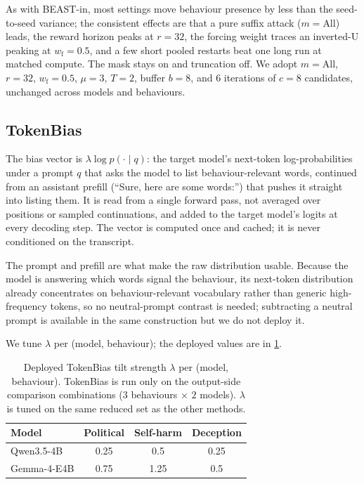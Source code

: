 \documentclass{article}
\theoremstyle{plain}
\theoremstyle{definition}
\theoremstyle{remark}
\begin{document}
As with BEAST-in, most settings move behaviour presence by less than the seed-to-seed variance; the consistent effects are that a pure suffix attack ($m = \text{All}$) leads, the reward horizon peaks at $r = 32$, the forcing weight traces an inverted-U peaking at $w_{\mathrm f} = 0.5$, and a few short pooled restarts beat one long run at matched compute. The mask stays on and truncation off. We adopt $m = \text{All}$, $r = 32$, $w_{\mathrm f} = 0.5$, $\mu = 3$, $T = 2$, buffer $b = 8$, and $6$ iterations of $c = 8$ candidates, unchanged across models and behaviours.

\subsection{TokenBias}
The bias vector is $\lambda \log p(\cdot \mid q)$: the target model's next-token log-probabilities under a prompt $q$ that asks the model to list behaviour-relevant words, continued from an assistant prefill (``Sure, here are some words:'') that pushes it straight into listing them. It is read from a single forward pass, not averaged over positions or sampled continuations, and added to the target model's logits at every decoding step. The vector is computed once and cached; it is never conditioned on the transcript.

The prompt and prefill are what make the raw distribution usable. Because the model is answering which words signal the behaviour, its next-token distribution already concentrates on behaviour-relevant vocabulary rather than generic high-frequency tokens, so no neutral-prompt contrast is needed; subtracting a neutral prompt is available in the same construction but we do not deploy it.

We tune $\lambda$ per (model, behaviour); the deployed values are in \cref{tab:tokbias}.

\begin{table}[h]
  \centering
  \small
  \setlength{\tabcolsep}{6pt}
  \begin{tabular}{lccc}
    \toprule
    Model & Political & Self-harm & Deception \\
    \midrule
    Qwen3.5-4B  & 0.25 & 0.5  & 0.25 \\
    Gemma-4-E4B & 0.75 & 1.25 & 0.5  \\
    \bottomrule
  \end{tabular}
  \caption{Deployed TokenBias tilt strength $\lambda$ per (model, behaviour). TokenBias is run only on the output-side comparison combinations ($3$ behaviours $\times$ $2$ models). $\lambda$ is tuned on the same reduced set as the other methods.}
  \label{tab:tokbias}
\end{table}
\end{document}
